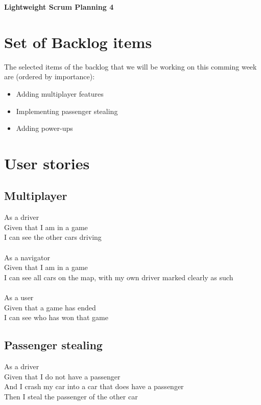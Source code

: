 \documentclass{article}
\begin{document}
\begin{minipage}[H]{\textwidth}
\vspace{0.3cm}
		\begin{center}
		\vspace{0.3cm}
			\Huge{\textbf{Lightweight Scrum Planning 4}}\\
		\vspace{0.3cm}	
		\vspace{0.7cm}		
		\end{center}
	\end{minipage}

\section*{Set of Backlog items}
The selected items of the backlog that we will be working on this comming week  are (ordered by importance):
\begin{itemize}
	\item Adding multiplayer features
	\item Implementing passenger stealing
	\item Adding power-ups
\end{itemize}

\section*{User stories}
\subsection*{Multiplayer}
As a driver\\
Given that I am in a game\\
I can see the other cars driving\\\\
As a navigator\\
Given that I am in a game\\
I can see all cars on the map, with my own driver marked clearly as such\\\\
As a user\\
Given that a game has ended\\
I can see who has won that game
\subsection*{Passenger stealing}
As a driver\\
Given that I do not have a passenger\\
And I crash my car into a car that does have a passenger\\
Then I steal the passenger of the other car\\\\
\end{document}
